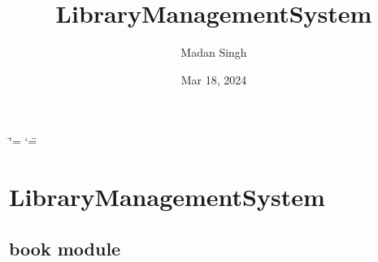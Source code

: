 \documentclass[letterpaper,10pt,english,openany,oneside]{sphinxmanual}
\title{Library\sphinxhyphen{}Management\sphinxhyphen{}System}
\date{Mar 18, 2024}
\author{Madan Singh}
\begin{document}
\ifdefined\shorthandoff
  \ifnum\catcode`\=\string=\active\shorthandoff{=}\fi
  \ifnum\catcode`\"=\active{}\fi
\fi

\pagestyle{empty}
\sphinxmaketitle
\pagestyle{plain}
\sphinxtableofcontents
\pagestyle{normal}
\label{\detokenize{index::doc}}


\sphinxstepscope


\chapter{Library\sphinxhyphen{}Management\sphinxhyphen{}System}
\label{\detokenize{modules:library-management-system}}\label{\detokenize{modules::doc}}
\sphinxstepscope


\section{book module}
\label{\detokenize{book:module-book}}\label{\detokenize{book:book-module}}\label{\detokenize{book::doc}}
\end{document}
